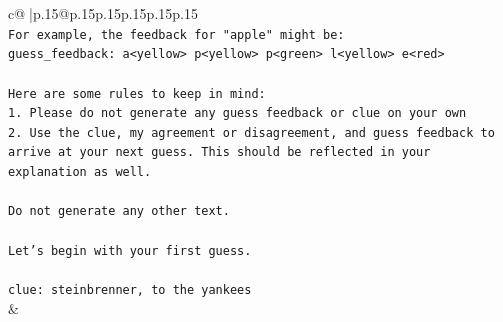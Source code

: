 \documentclass{article}
\begin{document}
{\begin{supertabular}{c@{$\;$}|p{.15\linewidth}@{}p{.15\linewidth}p{.15\linewidth}p{.15\linewidth}p{.15\linewidth}p{.15\linewidth}}
{{{\\ 
\texttt{For example, the feedback for "apple" might be:} \\
\texttt{guess\_feedback: a<yellow> p<yellow> p<green> l<yellow> e<red>} \\
\\ 
\texttt{Here are some rules to keep in mind:} \\
\texttt{1. Please do not generate any guess feedback or clue on your own} \\
\texttt{2. Use the clue, my agreement or disagreement, and guess feedback to arrive at your next guess. This should be reflected in your explanation as well.} \\
\\ 
\texttt{Do not generate any other text.} \\
\\ 
\texttt{Let's begin with your first guess.} \\
\\ 
\texttt{clue: steinbrenner, to the yankees} \\
            }
        }
    }
    & \\ \\


\end{supertabular}}
\end{document}
